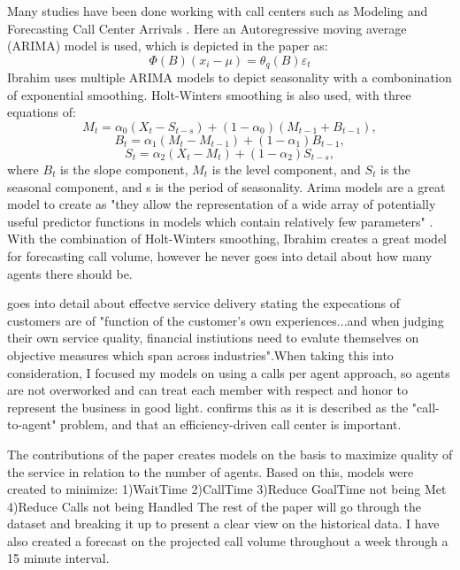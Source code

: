 \documentclass[12pt]{article}
\begin{document}
  Many studies have been done working with call centers such as Modeling and Forecasting Call Center Arrivals \citep{ibrahim2016modeling}.
Here an Autoregressive moving average (ARIMA) model is used, which is depicted in the paper as:
\begin{equation}
  \label{eq:ARIMA Standard}
  \Phi(B)(x_i -\mu)=\theta_q(B)\varepsilon_t
\end{equation}
Ibrahim uses multiple ARIMA models to depict seasonality with a combonination of exponential smoothing. Holt-Winters smoothing is also used,
with three equations of:
\begin{equation}
  \label{eq:Holt-Winters}
  M_t=\alpha_0(X_t-S_{t-s}) + (1-\alpha_0)(M_{t-1}+B_{t-1}),
\end{equation}
\begin{equation}
  \label{eq:Holt-Winters2}
  B_t=\alpha_1(M_t-M_{t-1}) +(1-\alpha_1)B_{t-1},
\end{equation}
\begin{equation}
  \label{eq:Holt-Winters3}
  S_t=\alpha_2(X_t-M_t) +(1-\alpha_2)S_{t-s},
\end{equation}
where $B_{t}$ is the slope component, $M_{t}$ is the level component, and $S_{t}$ is the seasonal component, and s is the period of seasonality.
Arima models are a great model to create as "they allow the  representation of a  wide array of potentially useful predictor functions in  models  which contain relatively few parameters" \citep{newbold1983arima}.
With the combination of Holt-Winters smoothing, Ibrahim creates a great model for forecasting call volume, however he never goes into detail about
how many agents there should be. 

  \citep{evensen1999effective} goes into detail about effectve service delivery stating the expecations of customers are of "function of
the customer's own experiences...and when judging their own service quality, financial instiutions need to evalute themselves on 
objective measures which span across industries".When taking this into consideration, I focused my models on using a calls per agent approach,
so agents are not overworked and can treat each member with respect and honor to represent the business in good light. \citep{avramidis2005modeling} confirms
this as it is described as the "call-to-agent" problem, and that an efficiency-driven call center is important.


  The contributions of the paper creates models on the basis to maximize quality of the service in relation to the number of agents. 
Based on this, models were created to minimize:
1)WaitTime
2)CallTime
3)Reduce GoalTime not being Met
4)Reduce Calls not being Handled
The rest of the paper will go through the dataset and breaking it up to present a clear view on the historical data. I have also created a 
forecast on the projected call volume throughout a week through a 15 minute interval.
\end{document}
